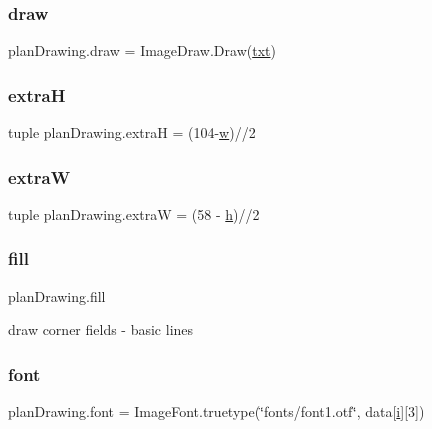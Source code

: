 \subsubsection{\texorpdfstring{draw}{draw}}
{\footnotesize\ttfamily plan\+Drawing.\+draw = Image\+Draw.\+Draw(\mbox{\hyperlink{namespaceplan_drawing_a6353872188dfcfa8978c7abce9af330f}{txt}})}

\mbox{\label{namespaceplan_drawing_af7d5ee628341623ec3f58c89c4c58162}} 
\subsubsection{\texorpdfstring{extraH}{extraH}}
{\footnotesize\ttfamily tuple plan\+Drawing.\+extraH = (104-\/\mbox{\hyperlink{namespaceplan_drawing_ad7a76c8ceac3b7ee1e99ff482407c1af}{w}})//2}

\mbox{\label{namespaceplan_drawing_adfaadcdef85cf3cd5d7bd077de6f2339}} 
\subsubsection{\texorpdfstring{extraW}{extraW}}
{\footnotesize\ttfamily tuple plan\+Drawing.\+extraW = (58 -\/ \mbox{\hyperlink{namespaceplan_drawing_ae4861d93282ebc625dbbc2f1676f3baf}{h}})//2}

\mbox{\label{namespaceplan_drawing_a19c8949ae2db8517ca8e83961816549d}} 
\subsubsection{\texorpdfstring{fill}{fill}}
{\footnotesize\ttfamily plan\+Drawing.\+fill}



draw corner fields -\/ basic lines 

\mbox{\label{namespaceplan_drawing_afddf021a6859fba763e2c602b49ad744}} 
\subsubsection{\texorpdfstring{font}{font}}
{\footnotesize\ttfamily plan\+Drawing.\+font = Image\+Font.\+truetype(\char`\"{}fonts/font1.\+otf\char`\"{}, data\mbox{[}\mbox{\hyperlink{namespaceplan_drawing_a9b507814fb99be9c876ea329f40fc0f1}{i}}\mbox{]}\mbox{[}3\mbox{]})}

